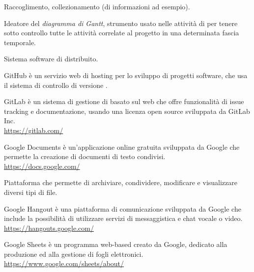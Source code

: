 Raccoglimento, collezionamento (di informazioni ad esempio).

Ideatore del \textit{diagramma di Gantt}, strumento usato nelle attività di  per tenere sotto controllo tutte le attività correlate al progetto in una determinata fascia temporale.

Sistema software di  distribuito.

GitHub è un servizio web di hosting per lo sviluppo di progetti software, che usa il sistema di controllo di versione .

GitLab è un sistema di gestione di   basato sul web che offre funzionalità di issue tracking e documentazione, usando una licenza open source sviluppata da GitLab Inc.\\
\url{https://gitlab.com/}

Google Documents è un’applicazione online gratuita sviluppata da Google che permette la creazione di documenti di testo condivisi.\\
\url{https://docs.google.com/}

Piattaforma che permette di archiviare, condividere, modificare e visualizzare diversi tipi di file.

Google Hangout è una piattaforma di comunicazione sviluppata da Google che include la possibilità di utilizzare servizi di messaggistica e chat vocale o video.\\
\url{https://hangouts.google.com/}

Google Sheets è un programma web-based creato da Google, dedicato alla produzione ed alla gestione di fogli elettronici.\\
\url{https://www.google.com/sheets/about/}
\clearpage
